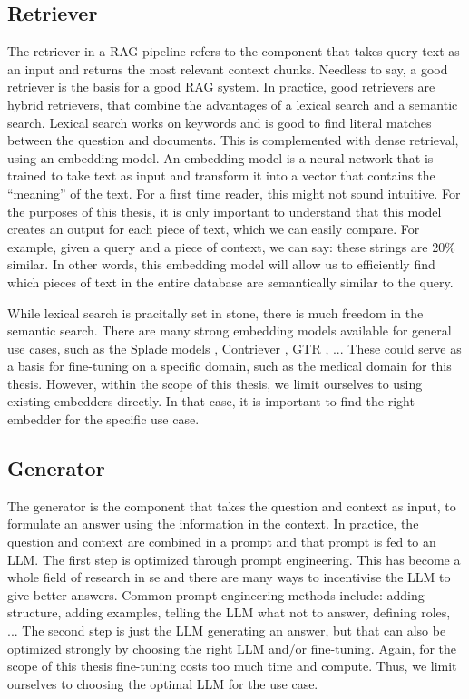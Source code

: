 \subsection{Retriever}
The retriever in a RAG pipeline refers to the component that takes query text as an input and returns the most relevant context chunks. Needless to say, a good retriever is the basis for a good RAG system. In practice, good retrievers are hybrid retrievers, that combine the advantages of a lexical search and a semantic search. Lexical search works on keywords and is good to find literal matches between the question and documents. This is complemented with dense retrieval, using an embedding model. An embedding model is a neural network that is trained to take text as input and transform it into a vector that contains the ``meaning'' of the text. For a first time reader, this might not sound intuitive. For the purposes of this thesis, it is only important to understand that this model creates an output for each piece of text, which we can easily compare. For example, given a query and a piece of context, we can say: these strings are 20\% similar. In other words, this embedding model will allow us to efficiently find which pieces of text in the entire database are semantically similar to the query. 

While lexical search is pracitally set in stone, there is much freedom in the semantic search. There are many strong embedding models available for general use cases, such as the Splade models \cite{formal2021splade, formal2021spladev2, lassance2024spladev3}, Contriever \cite{izacard2021unsupervisedcontriever}, GTR \cite{ni2021largegtr}, ... These could serve as a basis for fine-tuning on a specific domain, such as the medical domain for this thesis. However, within the scope of this thesis, we limit ourselves to using existing embedders directly. In that case, it is important to find the right embedder for the specific use case.

\subsection{Generator}
The generator is the component that takes the question and context as input, to formulate an answer using the information in the context. In practice, the question and context are combined in a prompt and that prompt is fed to an LLM. The first step is optimized through prompt engineering. This has become a whole field of research in se and there are many ways to incentivise the LLM to give better answers. Common prompt engineering methods include: adding structure, adding examples, telling the LLM what not to answer, defining roles, ... The second step is just the LLM generating an answer, but that can also be optimized strongly by choosing the right LLM and/or fine-tuning. Again, for the scope of this thesis fine-tuning costs too much time and compute. Thus, we limit ourselves to choosing the optimal LLM for the use case.

